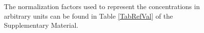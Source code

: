 \documentclass[oneside, 10pt, a4paper, twocolumn]{article}
\begin{document}
\begin{figure}
{{%
The normalization factors used to represent the concentrations in arbitrary units can be found in Table \ref{TabRefVal} of the Supplementary Material.}}
  \label{Figure1label}
\end{figure}

\clearpage

\end{document}
